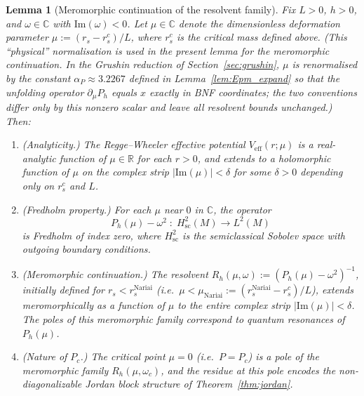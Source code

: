 \documentclass[12pt,a4paper]{amsart}
\newtheorem{lemma}[theorem]{Lemma}
\theoremstyle{remark}
\begin{document}
\begin{lemma}[Meromorphic continuation of the resolvent family]
\label{lem:meromorphic_continuation}
Fix $L > 0$, $h > 0$, and $\omega \in \mathbb{C}$ with
$\mathrm{Im}(\omega) < 0$.
Let $\mu \in \mathbb{C}$ denote the dimensionless deformation parameter
$\mu := (r_s - r_s^c)/L$, where $r_s^c$ is the critical mass defined above.
(This ``physical'' normalisation is used in the present lemma for the meromorphic
continuation.  In the Grushin reduction of Section~\ref{sec:grushin}, $\mu$ is
renormalised by the constant $\alpha_{P} \approx 3.2267$ defined in
Lemma~\ref{lem:Epm_expand} so that the unfolding operator $\partial_{\mu}P_{h}$
equals $x$ exactly in BNF coordinates; the two conventions differ only by this
nonzero scalar and leave all resolvent bounds unchanged.)
Then:
\begin{enumerate}
\item[(i)] \emph{(Analyticity.)}
  { The Regge--Wheeler effective potential $V_{\mathrm{eff}}(r;\mu)$
  is a real-analytic function of $\mu \in \mathbb{R}$ for each $r > 0$,
  and extends to a holomorphic function of $\mu$ on the complex strip
  $|\mathrm{Im}(\mu)| < \delta$ for some $\delta > 0$ depending
  only on $r_s^c$ and $L$.}

\item[(ii)] \emph{(Fredholm property.)}
  For each $\mu$ near $0$ in $\mathbb{C}$, the operator
  \[
    P_h(\mu) - \omega^2 \;:\; H^2_{\mathrm{sc}}(M) \to L^2(M)
  \]
  is Fredholm of index zero, where $H^2_{\mathrm{sc}}$ is the
  semiclassical Sobolev space with outgoing boundary conditions.

\item[(iii)] \emph{(Meromorphic continuation.)}
  The resolvent $R_h(\mu,\omega) := (P_h(\mu) - \omega^2)^{-1}$,
  initially defined for $r_s < r_s^{\mathrm{Nariai}}$ (i.e.\
  $\mu < \mu_{\mathrm{Nariai}} := (r_s^{\mathrm{Nariai}} - r_s^c)/L$),
  extends meromorphically as a function of $\mu$ to the entire
  complex strip $|\mathrm{Im}(\mu)| < \delta$. The poles of this
  meromorphic family correspond to quantum resonances of $P_h(\mu)$.

\item[(iv)] \emph{(Nature of $P_c$.)}
  The critical point $\mu = 0$ (i.e.\ $P = P_c$) is a pole of the
  meromorphic family $R_h(\mu, \omega_c)$, and the residue at this
  pole encodes the non-diagonalizable Jordan block structure of
  Theorem~\ref{thm:jordan}.
\end{enumerate}
\end{lemma}
\end{document}
